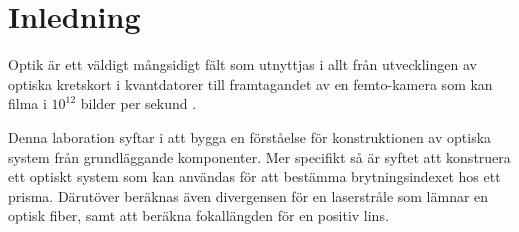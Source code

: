 \documentclass[a4paper]{article}
\begin{document}
\vspace{3mm}

\section{Inledning}

%



Optik är ett väldigt mångsidigt fält som utnyttjas i allt från utvecklingen av optiska kretskort i kvantdatorer \cite{quantumOptics} till framtagandet av en femto-kamera som kan filma i $10^{12}$ bilder per sekund \cite{femtoKamera}.

Denna laboration syftar i att bygga en förståelse för konstruktionen av optiska system från grundläggande komponenter. Mer specifikt så är syftet att konstruera ett optiskt system som kan användas för att bestämma brytningsindexet hos ett prisma. Därutöver beräknas även divergensen för en laserstråle som lämnar en optisk fiber, samt att beräkna fokallängden för en positiv lins.
\end{document}
